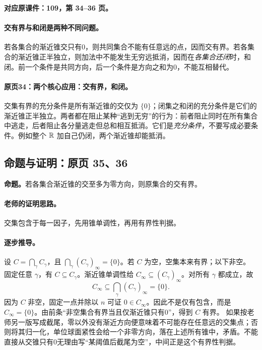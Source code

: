 \textbf{对应原课件：109，第 34--36 页。}


\paragraph{交有界与和闭是两种不同问题。}
若各集合的渐近锥交只有0，则共同集合不能有任意远的点，因而交有界。若各集合的渐近锥正半独立，则加法中不能发生无穷远抵消，因而在\emph{各集合还闭}时，和闭。前一个条件是共同方向，后一个条件是方向之和为0，不能互相替代。


\paragraph{原页34：两个核心应用：交有界，和闭。}交集有界的充分条件是所有渐近锥的交仅为 $\{0\}$；闭集之和闭的充分条件是它们的渐近锥正半独立。两者都在阻止某种“逃到无穷”的行为：前者阻止同时在所有集合中逃走，后者阻止各分量逃走但总和相互抵消。它们是\emph{充分条件}，不要写成必要条件。例如整个 $\mathbb{R}$ 加自己仍闭，两个渐近锥却能抵消。



\subsection{命题与证明：原页 35、36}

\textbf{命题。}若各集合渐近锥的交至多为零方向，则原集合的交有界。

\paragraph{老师的证明思路。}交集包含于每一因子，先用锥单调性，再用有界性判据。

\paragraph{逐步推导。}
设 $C=\bigcap_\gamma C_\gamma$，且 $\bigcap_\gamma(C_\gamma)_\infty=\{0\}$。若 $C$ 为空，空集本来有界；以下非空。
固定任意 $\gamma$，有 $C\subseteq C_\gamma$。渐近锥单调性给 $C_\infty\subseteq(C_\gamma)_\infty$。对所有 $\gamma$ 都成立，故
\[C_\infty\subseteq\bigcap_\gamma(C_\gamma)_\infty=\{0\}.\]
因为 $C$ 非空，固定一点并除以 $n$ 可证 $0\in C_\infty$。因此不是仅有包含，而是 $C_\infty=\{0\}$。由前条“非空集合有界当且仅渐近锥只有0”，得到 $C$ 有界。
如果按老师另一版写成截尾，零以外没有渐近方向便意味着不可能存在任意远的交集点；否则将其归一化，单位球面紧性会给一个非零方向，落在上述所有锥中，矛盾。不能直接从交锥只有0无理由写“某阈值后截尾为空”，中间正是这个有界性判据。


